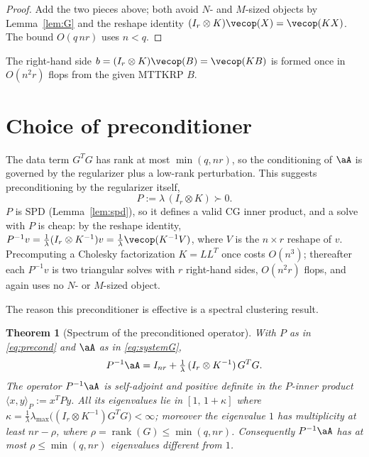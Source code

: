 \documentclass[12pt]{article}
\newtheorem{theorem}{Theorem}
\theoremstyle{definition}
\begin{document}
\begin{proof}
Add the two pieces above; both avoid $N$- and $M$-sized objects by
Lemma~\ref{lem:G} and the reshape identity $(I_r\otimes K)\vecop(X)=\vecop(KX)$.
The bound $O(q\,nr)$ uses $n<q$.
\end{proof}

The right-hand side $b=(I_r\otimes K)\vecop(B)=\vecop(KB)$ is formed once in
$O(n^2r)$ flops from the given MTTKRP $B$.

\section{Choice of preconditioner}

The data term $G^{T}G$ has rank at most $\min(q,nr)$, so the conditioning of
$\aA$ is governed by the regularizer plus a low-rank perturbation. This
suggests preconditioning by the regularizer itself,
\begin{equation}\label{eq:precond}
P:=\lambda\,(I_r\otimes K)\succ0 .
\end{equation}
$P$ is SPD (Lemma~\ref{lem:spd}), so it defines a valid CG inner product, and a
solve with $P$ is cheap: by the reshape identity,
$P^{-1}v=\tfrac1\lambda(I_r\otimes K^{-1})v=\tfrac1\lambda\vecop(K^{-1}V)$, where
$V$ is the $n\times r$ reshape of $v$. Precomputing a Cholesky factorization
$K=LL^{T}$ once costs $O(n^{3})$; thereafter each $P^{-1}v$ is two triangular
solves with $r$ right-hand sides, $O(n^{2}r)$ flops, and again uses no
$N$- or $M$-sized object.

The reason this preconditioner is effective is a spectral clustering result.

\begin{theorem}[Spectrum of the preconditioned operator]\label{thm:spec}
With $P$ as in \eqref{eq:precond} and $\aA$ as in \eqref{eq:systemG},
\begin{equation}\label{eq:precop}
P^{-1}\aA=I_{nr}+\tfrac1\lambda\,(I_r\otimes K^{-1})\,G^{T}G .
\end{equation}
The operator $P^{-1}\aA$ is self-adjoint and positive definite in the
$P$-inner product $\langle x,y\rangle_P:=x^{T}Py$. All its eigenvalues lie in
$[1,\,1+\kappa]$ where $\kappa=\tfrac1\lambda\lambda_{\max}\!\big((I_r\otimes
K^{-1})G^{T}G\big)<\infty$; moreover the eigenvalue $1$ has multiplicity at
least $nr-\rho$, where $\rho=\operatorname{rank}(G)\le\min(q,nr)$. Consequently
$P^{-1}\aA$ has at most $\rho\le\min(q,nr)$ eigenvalues different from $1$.
\end{theorem}
\end{document}
